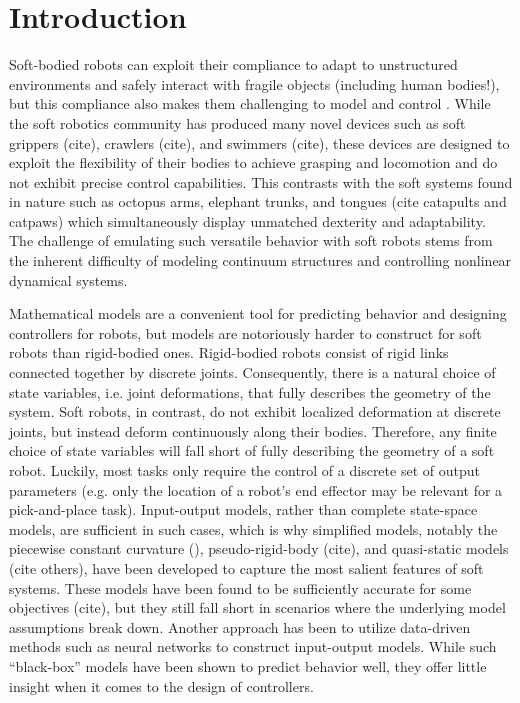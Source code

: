 \section{Introduction} 
\label{sec:intro}

Soft-bodied robots can exploit their compliance to adapt to unstructured environments and safely interact with fragile objects (including human bodies!), but this compliance also makes them challenging to model and control \cite{rus2015design}.
While the soft robotics community has produced many novel devices such as soft grippers (cite), crawlers (cite), and swimmers (cite), these devices are designed to exploit the flexibility of their bodies to achieve grasping and locomotion and do not exhibit precise control capabilities.
This contrasts with the soft systems found in nature such as octopus arms, elephant trunks, and tongues (cite catapults and catpaws) which simultaneously display unmatched dexterity and adaptability.
The challenge of emulating such versatile behavior with soft robots stems from the inherent difficulty of modeling continuum structures and controlling nonlinear dynamical systems. 

Mathematical models are a convenient tool for predicting behavior and designing controllers for robots, but models are notoriously harder to construct for soft robots than rigid-bodied ones.
Rigid-bodied robots consist of rigid links connected together by discrete joints.
Consequently, there is a natural choice of state variables, i.e. joint deformations, that fully describes the geometry of the system.
Soft robots, in contrast, do not exhibit localized deformation at discrete joints, but instead deform continuously along their bodies.
Therefore, any finite choice of state variables will fall short of fully describing the geometry of a soft robot.
Luckily, most tasks only require the control of a discrete set of output parameters (e.g. only the location of a robot's end effector may be relevant for a pick-and-place task).
Input-output models, rather than complete state-space models, are sufficient in such cases, which is why
simplified models, notably the piecewise constant curvature (\cite{webster2010design}), pseudo-rigid-body (cite), and quasi-static models \cite{bruder2018iros} (cite others), have been developed to capture the most salient features of soft systems.
These models have been found to be sufficiently accurate for some objectives (cite), but they still fall short in scenarios where the underlying model assumptions break down.
Another approach has been to utilize data-driven methods such as neural networks \cite{gillespie2018learning} to construct input-output models.
While such ``black-box'' models have been shown to predict behavior well, they offer little insight when it comes to the design of controllers.


